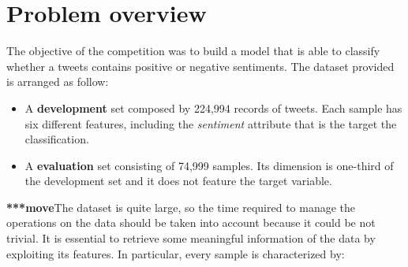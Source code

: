 \documentclass[conference]{IEEEtran}
\begin{document}
\section{Problem overview}\label{sec:overview}
The objective of the competition was to build a model that is able to classify whether a tweets contains positive or negative sentiments. The dataset provided is arranged as follow:
\begin{itemize}
    \item A \textbf{development} set composed by 224,994 records of tweets. Each sample has six different features, including the \textit{sentiment} attribute that is the target the classification.
    \item A \textbf{evaluation} set consisting of 74,999 samples. Its dimension is one-third of the development set and it does not feature the target variable.
\end{itemize}
\textbf{***move}The dataset is quite large, so the time required to manage the operations on the data should be taken into account because it could be not trivial. It is essential to retrieve some meaningful information of the data by exploiting its features. In particular, every sample is characterized by:
\end{document}
